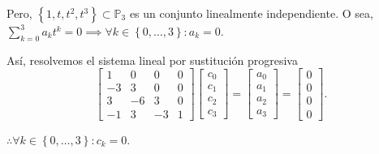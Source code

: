 \begin{frame}
    \begin{solution}
        Pero,
        \begin{math}
            \left\{
            1,
            t,
            t^{2},
            t^{3}
            \right\}\subset\mathbb{P}_{3}
        \end{math}
        es un conjunto linealmente independiente.
        O sea,
        \begin{math}
            \sum\limits_{k=0}^{3}
            a_{k}
            t^{k}=
            0\implies
            \forall k\in\left\{0,\dotsc,3\right\}:
            a_{k}=0
        \end{math}.

        Así, resolvemos el sistema lineal por sustitución progresiva
        \begin{equation*}
            \begin{bmatrix}
                1  & 0  & 0  & 0 \\
                -3 & 3  & 0  & 0 \\
                3  & -6 & 3  & 0 \\
                -1 & 3  & -3 & 1
            \end{bmatrix}
            \begin{bmatrix}
                c_{0} \\
                c_{1} \\
                c_{2} \\
                c_{3}
            \end{bmatrix}=
            \begin{bmatrix}
                a_{0} \\
                a_{1} \\
                a_{2} \\
                a_{3}
            \end{bmatrix}=
            \begin{bmatrix}
                0 \\
                0 \\
                0 \\
                0
            \end{bmatrix}.
        \end{equation*}

        \begin{math}
            \therefore
            \forall k\in\left\{0,\dotsc,3\right\}:
            c_{k}=0
        \end{math}.


\end{solution}
\end{frame}
